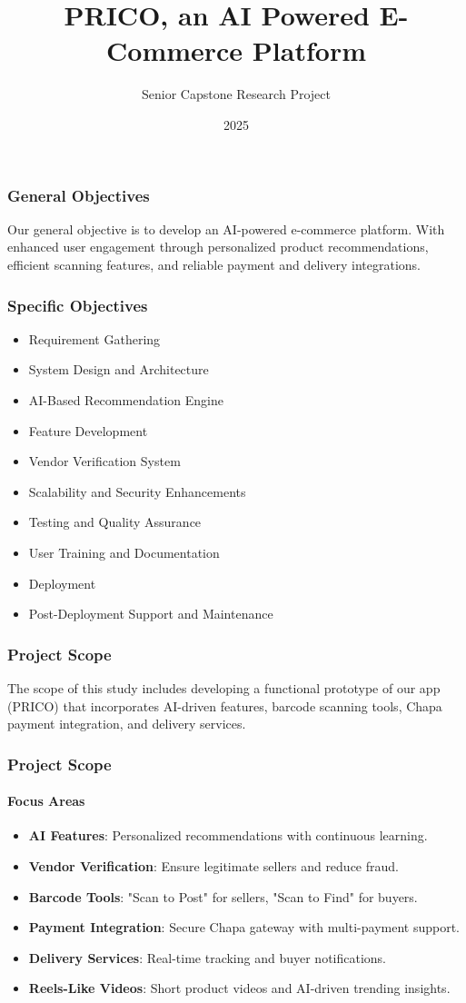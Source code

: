 \documentclass{beamer}
\title{PRICO, an AI Powered E-Commerce Platform}
\subtitle{Senior Capstone Research Project}
\institute{Addis Ababa Science and Technology University}
\date{2025}
\begin{document}
\frame{\titlepage}

\begin{frame}
	\frametitle{General Objectives}

	Our general objective is to develop an AI-powered e-commerce platform. With enhanced user
	engagement through personalized product recommendations, efficient scanning features, and
	reliable payment and delivery integrations.
\end{frame}

\begin{frame}
	\frametitle{Specific Objectives}
	\begin{itemize}
		\item Requirement Gathering
		\item System Design and Architecture
		\item AI-Based Recommendation Engine
		\item Feature Development
		\item Vendor Verification System
		\item Scalability and Security Enhancements
		\item Testing and Quality Assurance
		\item User Training and Documentation
		\item Deployment
		\item Post-Deployment Support and Maintenance
	\end{itemize}
\end{frame}

\begin{frame}
	\frametitle{Project Scope}
	The scope of this study includes developing a functional prototype of our app
	(PRICO) that incorporates AI-driven features, barcode scanning tools, Chapa
	payment integration, and delivery services.
\end{frame}

\begin{frame}
	\frametitle{Project Scope}
	\framesubtitle{Focus Areas}
	\begin{itemize}
		\item \textbf{AI Features}: Personalized recommendations with continuous learning.
		\item \textbf{Vendor Verification}: Ensure legitimate sellers and reduce fraud.
		\item \textbf{Barcode Tools}: "Scan to Post" for sellers, "Scan to Find" for buyers.
		\item \textbf{Payment Integration}: Secure Chapa gateway with multi-payment support.
		\item \textbf{Delivery Services}: Real-time tracking and buyer notifications.
		\item \textbf{Reels-Like Videos}: Short product videos and AI-driven trending insights.
	\end{itemize}
\end{frame}
\end{document}
